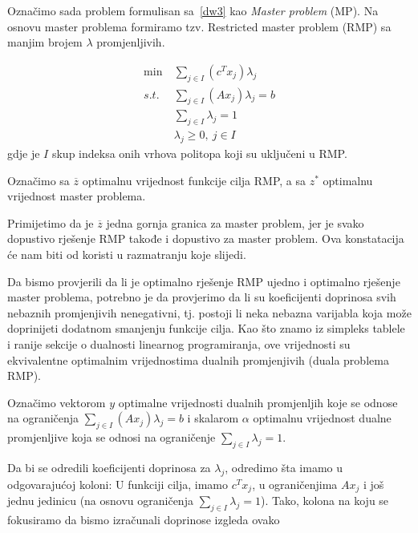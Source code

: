 \documentclass[a4paper, utf8, 11pt, colorlinks]{book}
\begin{document}
 Označimo sada problem formulisan  sa~\ref{dw3} kao \emph{Master problem} (MP). Na osnovu master problema formiramo tzv. Restricted master problem (RMP)  sa manjim brojem $\lambda$ promjenljivih.
 
     \begin{equation}
 	\begin{aligned}\label{dw4}
 		\min\  & \sum_{j\in I}(c^T x_j)\lambda_j\\
 		s.t.\  &\sum_{j\in I} (A x_j)\lambda_j=b\\
 		&\sum_{j\in I}\lambda_j = 1\\
 		&\lambda_j\geqslant 0,\ j  \in I
 	\end{aligned}
 \end{equation}
gdje je $I$ skup indeksa onih vrhova politopa koji su uključeni u RMP.

Označimo sa $\overline{z}$ optimalnu vrijednost funkcije cilja RMP, a sa $z^*$ optimalnu vrijednost master problema.

Primijetimo da je $\overline{z}$ jedna gornja granica za master problem, jer je svako dopustivo rješenje RMP takođe i dopustivo za master problem. Ova konstatacija će nam biti od koristi u razmatranju koje slijedi.

Da bismo provjerili da li je optimalno rješenje RMP ujedno i optimalno rješenje master problema, potrebno je da provjerimo da li su koeficijenti doprinosa svih nebaznih promjenjivih nenegativni, tj. postoji li neka nebazna varijabla koja može doprinijeti dodatnom smanjenju funkcije cilja. Kao što znamo iz simpleks tablele i ranije sekcije o dualnosti linearnog programiranja, ove vrijednosti su ekvivalentne optimalnim vrijednostima dualnih promjenjivih (duala problema RMP).   



Označimo vektorom $y$ optimalne vrijednosti dualnih promjenljih koje se odnose na ograničenja $\sum_{j\in I} (A x_j)\lambda_j=b$ i skalarom $\alpha$ optimalnu vrijednost dualne promjenljive koja se odnosi na ograničenje $\sum_{j\in I}\lambda_j = 1$. 

Da bi se odredili   koeficijenti doprinosa za $\lambda_j$, odredimo šta imamo u odgovarajućoj koloni: U funkciji cilja, imamo $c^Tx_j$, u ograničenjima $Ax_j$ i još jednu jedinicu (na osnovu ograničenja $\sum_{j\in I}\lambda_j = 1$). Tako, kolona na koju se fokusiramo da bismo izračunali doprinose izgleda ovako
\end{document}
